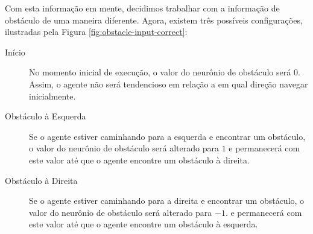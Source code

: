Com esta informação em mente, decidimos trabalhar com a informação de obstáculo
de uma maneira diferente. Agora, existem três possíveis configurações,
ilustradas pela Figura \ref{fig:obstacle-input-correct}:

\begin{description}
	\item[Início]
		No momento inicial de execução, o valor do neurônio de obstáculo será
		$0$. Assim, o agente não será tendencioso em relação a em qual direção
		navegar inicialmente.

	\item[Obstáculo à Esquerda]
		Se o agente estiver caminhando para a esquerda e encontrar um obstáculo,
		o valor do neurônio de obstáculo será alterado para $1$ e permanecerá
		com este valor até que o agente encontre um obstáculo à direita.

	\item[Obstáculo à Direita]
		Se o agente estiver caminhando para a direita e encontrar um obstáculo,
		o valor do neurônio de obstáculo será alterado para $-1$. e permanecerá
		com este valor até que o agente encontre um obstáculo à esquerda.
\end{description}

